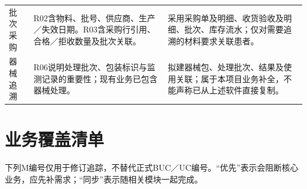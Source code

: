 \documentclass[UTF8,a4paper,zihao=-4,fontset=none]{ctexart}
\begin{document}
{\begin{longtable}{@{}p{2.0cm}p{6.0cm}p{7.5cm}@{}}
\raggedright\arraybackslash 批次采购 & \raggedright\arraybackslash R02含物料、批号、供应商、生产／失效日期。R03含采购行引用、合格／拒收数量及批次关联。 & \raggedright\arraybackslash 采用采购单及明细、收货验收及明细、批次、库存流水；仅对需要追溯的材料要求关联患者。 \\[4pt]
\raggedright\arraybackslash 器械追溯 & \raggedright\arraybackslash R06说明处理批次、包装标识与监测记录的重要性；现有业务已包含器械处理。 & \raggedright\arraybackslash 拟建器械包、处理批次、结果及使用关联；属于本项目业务补全，不能声称已从上述软件直接复制。 \\[4pt]
\bottomrule
\end{longtable}
}
\clearpage\section{业务覆盖清单}
下列M编号仅用于修订追踪，不替代正式BUC／UC编号。“优先”表示会阻断核心业务，应先补需求；“同步”表示随相关模块一起完成。
\end{document}
